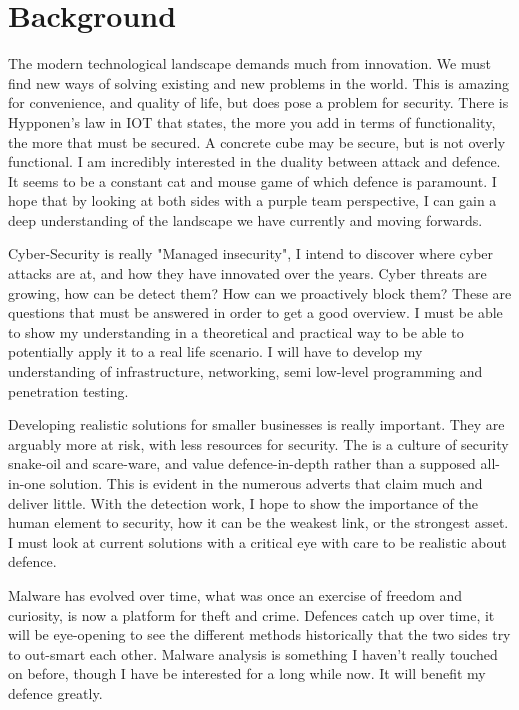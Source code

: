 
\section{Background}
The modern technological landscape demands much from innovation. 
We must find new ways of solving existing and new problems in the world. 
This is amazing for convenience, and quality of life, but does pose a problem for security. 
There is Hypponen's law in IOT that states, the more you add in terms of functionality, the more that must be secured. 
A concrete cube may be secure, but is not overly functional. I am incredibly interested in the duality between attack and defence. 
It seems to be a constant cat and mouse game of which defence is paramount. 
I hope that by looking at both sides with a purple team perspective, I can gain a deep understanding of the landscape we have currently and moving forwards. 

Cyber-Security is really "Managed insecurity", I intend to discover where cyber attacks are at, and how they have innovated over the years.
Cyber threats are growing, how can be detect them? How can we proactively block them? These are questions that must be answered in order to get a good overview.
I must be able to show my understanding in a theoretical and practical way to be able to potentially apply it to a real life scenario. 
I will have to develop my understanding of infrastructure, networking, semi low-level programming and penetration testing.

Developing realistic solutions for smaller businesses is really important. They are arguably more at risk, with less resources for security. 
The is a culture of security snake-oil and scare-ware, and value defence-in-depth rather than a supposed all-in-one solution. This is evident in the numerous adverts that claim much and deliver little.
With the detection work, I hope to show the importance of the human element to security, how it can be the weakest link, or the strongest asset. 
I must look at current solutions with a critical eye with care to be realistic about defence. 

Malware has evolved over time, what was once an exercise of freedom and curiosity, is now a platform for theft and crime. 
Defences catch up over time, it will be eye-opening to see the different methods historically that the two sides try to out-smart each other.
Malware analysis is something I haven't really touched on before, though I have be interested for a long while now. It will benefit my defence greatly.


